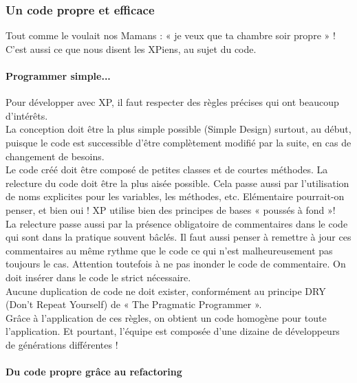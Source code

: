 \documentclass[]{article}
\let\oldparagraph\paragraph
\renewcommand{\paragraph}[1]{\oldparagraph{#1}\mbox{}}
\begin{document}
\hypertarget{un-code-propre-et-efficace}{%
\subsubsection{Un code propre et
efficace}\label{un-code-propre-et-efficace}}

Tout comme le voulait nos Mamans : « je veux que ta chambre soir propre
» ! C'est aussi ce que nous disent les XPiens, au sujet du code.




\hypertarget{programmer-simple...}{%
\paragraph{Programmer simple...}\label{programmer-simple...}}

Pour développer avec XP, il faut respecter des règles précises qui ont
beaucoup d'intérêts.~\\
La conception doit être la plus simple possible (Simple Design) surtout,
au début, puisque le code est successible d'être complètement modifié
par la suite, en cas de changement de besoins.\\
Le code créé doit être composé de petites classes et de courtes
méthodes. La relecture du code doit être la plus aisée possible. Cela
passe aussi par l'utilisation de noms explicites pour les variables, les
méthodes, etc. Elémentaire pourrait-on penser, et bien oui ! XP utilise
bien des principes de bases « poussés à fond »!\\
La relecture passe aussi par la présence obligatoire de commentaires
dans le code qui sont dans la pratique souvent bâclés. Il faut aussi
penser à remettre à jour ces commentaires au même rythme que le code ce
qui n'est malheureusement pas toujours le cas. Attention toutefois à ne
pas inonder le code de commentaire. On doit insérer dans le code le
strict nécessaire.\\
Aucune duplication de code ne doit exister, conformément au principe DRY
(Don't Repeat Yourself) de « The Pragmatic Programmer ».\\
Grâce à l'application de ces règles, on obtient un code homogène pour
toute l'application. Et pourtant, l'équipe est composée d'une dizaine de
développeurs de générations différentes !~




\hypertarget{du-code-propre-gruxe2ce-au-refactoring}{%
\paragraph{Du code propre grâce au
refactoring}\label{du-code-propre-gruxe2ce-au-refactoring}}
\end{document}
